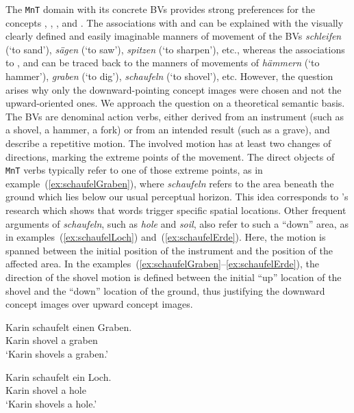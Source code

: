 \documentclass[output=paper]{langsci/langscibook}
\begin{document}
The \texttt{MnT} domain with its concrete BVs provides strong
preferences for the concepts ,
, ,  and
. The associations with  and
 can be explained with the visually clearly defined
and easily imaginable manners of movement of the BVs
\textit{schleifen} (`to sand'), \textit{sägen} (`to saw'),
\textit{spitzen} (`to sharpen'), etc., whereas the associations to
,  and  can
be traced back to the manners of movements of \textit{hämmern} (`to
hammer'), \textit{graben} (`to dig'), \textit{schaufeln} (`to
shovel'), etc. However, the question arises why only the
downward-pointing concept images were chosen and not the upward-oriented ones. We
approach the question on a theoretical semantic basis. The BVs are
denominal action verbs, either derived from an instrument (such as a
shovel, a hammer, a fork) or from an intended result (such as a
grave), and describe a repetitive motion. The involved motion has at
least two changes of directions, marking the extreme points of the
movement. The direct objects of \texttt{MnT} verbs typically refer to
one of those extreme points, as in example~(\ref{ex:schaufelGraben}),
where \textit{schaufeln} refers to the area beneath the ground which
lies below our usual perceptual horizon. This idea corresponds to
\cite{LachmairEtAl:16}'s research which shows that words trigger
specific spatial locations. Other frequent arguments of
\textit{schaufeln}, such as \textit{hole} and \textit{soil}, also
refer to such a ``down'' area, as in examples~(\ref{ex:schaufelLoch})
and~(\ref{ex:schaufelErde}). Here, the motion is spanned between the
initial position of the instrument and the position of the affected
area. In the
examples~(\ref{ex:schaufelGraben}--\ref{ex:schaufelErde}), the
direction of the shovel motion is defined between the initial ``up''
location of the shovel and the ``down'' location of the ground, thus
justifying the downward concept images over upward concept images.

\ea\label{ex:schaufelGraben} 
\gll Karin schaufelt einen Graben.\\ 
Karin shovel a graben\\
\glt `Karin shovels a graben.'
\z 

\ea\label{ex:schaufelLoch} 
\gll Karin schaufelt ein Loch.\\ 
Karin shovel a hole\\
\glt `Karin shovels a hole.'
\z  
\end{document}
